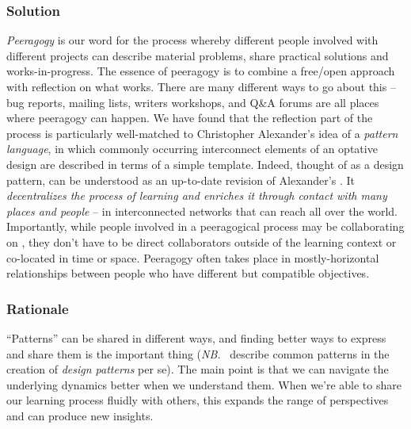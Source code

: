 \subsubsection*{Solution} \emph{Peeragogy} is our word for the process whereby different people involved with different projects can describe material problems, share practical solutions and works-in-progress.  The essence of peeragogy is to combine a free/open approach with reflection on what works.  There are many different ways to go about this -- bug reports, mailing lists, writers workshops, and Q\&A forums are all places where peeragogy can happen.  We have found that the reflection part of the process is particularly well-matched to Christopher Alexander's idea of a \emph{pattern language}, in which commonly occurring  interconnect elements of an optative design are described in terms of a simple template.  Indeed, thought of as a design pattern,  can be understood as an up-to-date revision of Alexander's  \cite[p. 99]{alexander1977pattern}.  It \emph{decentralizes the process of learning and enriches it through contact with many places and people} -- in interconnected networks that can reach all over the world.   Importantly, while people involved in a peeragogical process may be collaborating on , they don't have to be direct collaborators outside of the learning context or co-located in time or space.  Peeragogy often takes place in mostly-horizontal relationships between people who have different but compatible objectives.

\subsubsection*{Rationale}
``Patterns'' can be shared in different ways, and finding better ways to express and share them is the important thing (\emph{NB.}~\cite{meszaros1998pattern} describe common patterns in the creation of \emph{design patterns} per se).  The main point is that we can navigate the underlying dynamics better when we understand them.  When we're able to share our learning process fluidly with others, this expands the range of perspectives and can produce new insights. 

